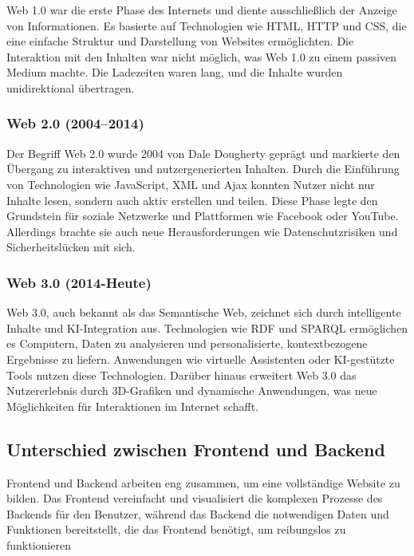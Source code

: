 Web 1.0 war die erste Phase des Internets und diente ausschließlich der Anzeige von Informationen. Es basierte auf Technologien wie HTML, HTTP und CSS, die eine einfache Struktur und Darstellung von Websites ermöglichten. Die Interaktion mit den Inhalten war nicht möglich, was Web 1.0 zu einem passiven Medium machte. Die Ladezeiten waren lang, und die Inhalte wurden unidirektional übertragen.\textit{\cite{jacksi2019development}}

\subsubsection{Web 2.0 (2004–2014)}

Der Begriff Web 2.0 wurde 2004 von Dale Dougherty geprägt und markierte den Übergang zu interaktiven und nutzergenerierten Inhalten. Durch die Einführung von Technologien wie JavaScript, XML und Ajax konnten Nutzer nicht nur Inhalte lesen, sondern auch aktiv erstellen und teilen. Diese Phase legte den Grundstein für soziale Netzwerke und Plattformen wie Facebook oder YouTube. Allerdings brachte sie auch neue Herausforderungen wie Datenschutzrisiken und Sicherheitslücken mit sich.\textit{\cite{jacksi2019development}}

\subsubsection{Web 3.0 (2014-Heute)}

Web 3.0, auch bekannt als das Semantische Web, zeichnet sich durch intelligente Inhalte und KI-Integration aus. Technologien wie RDF und SPARQL ermöglichen es Computern, Daten zu analysieren und personalisierte, kontextbezogene Ergebnisse zu liefern. Anwendungen wie virtuelle Assistenten oder KI-gestützte Tools nutzen diese Technologien. Darüber hinaus erweitert Web 3.0 das Nutzererlebnis durch 3D-Grafiken und dynamische Anwendungen, was neue Möglichkeiten für Interaktionen im Internet schafft.\textit{\cite{jacksi2019development}}

\subsection{Unterschied zwischen Frontend und Backend}

Frontend und Backend arbeiten eng zusammen, um eine vollständige Website zu bilden. Das Frontend vereinfacht und visualisiert die komplexen Prozesse des Backends für den Benutzer, während das Backend die notwendigen Daten und Funktionen bereitstellt, die das Frontend benötigt, um reibungslos zu funktionieren\textit{\cite{ionos_backend_frontend}}

